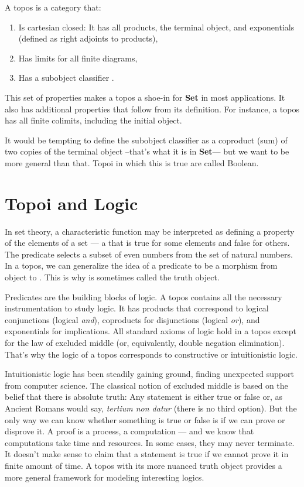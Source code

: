 A topos is a category that:

\begin{enumerate}
\tightlist
\item
  Is cartesian closed: It has all products, the terminal object, and
  exponentials (defined as right adjoints to products),
\item
  Has limits for all finite diagrams,
\item
  Has a subobject classifier .
\end{enumerate}

This set of properties makes a topos a shoe-in for \textbf{Set} in most
applications. It also has additional properties that follow from its
definition. For instance, a topos has all finite colimits, including the
initial object.

It would be tempting to define the subobject classifier as a coproduct
(sum) of two copies of the terminal object --that's what it is in
\textbf{Set}--- but we want to be more general than that. Topoi in which
this is true are called Boolean.

\section{Topoi and Logic}\label{topoi-and-logic}

In set theory, a characteristic function may be interpreted as defining
a property of the elements of a set --- a  that is true
for some elements and false for others. The predicate 
selects a subset of even numbers from the set of natural numbers. In a
topos, we can generalize the idea of a predicate to be a morphism from
object  to . This is why  is sometimes
called the truth object.

Predicates are the building blocks of logic. A topos contains all the
necessary instrumentation to study logic. It has products that
correspond to logical conjunctions (logical \emph{and}), coproducts for
disjunctions (logical \emph{or}), and exponentials for implications. All
standard axioms of logic hold in a topos except for the law of excluded
middle (or, equivalently, double negation elimination). That's why the
logic of a topos corresponds to constructive or intuitionistic logic.

Intuitionistic logic has been steadily gaining ground, finding
unexpected support from computer science. The classical notion of
excluded middle is based on the belief that there is absolute truth: Any
statement is either true or false or, as Ancient Romans would say,
\emph{tertium non datur} (there is no third option). But the only way we
can know whether something is true or false is if we can prove or
disprove it. A proof is a process, a computation --- and we know that
computations take time and resources. In some cases, they may never
terminate. It doesn't make sense to claim that a statement is true if we
cannot prove it in finite amount of time. A topos with its more nuanced
truth object provides a more general framework for modeling interesting
logics.

